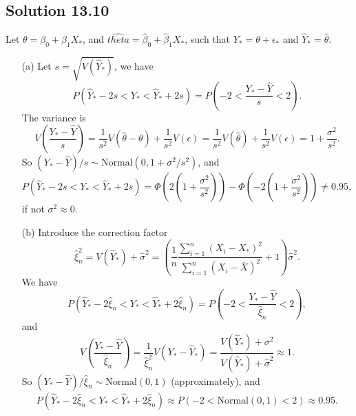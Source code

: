 \subsection*{Solution 13.10}

Let $\theta = \beta_0 + \beta_1 X_*$, and $\hat{theta} = \hat{\beta}_0 + \hat{\beta}_1 X_*$, such that $Y_* = \theta + \epsilon_*$ and $\hat{Y}_* = \hat{\theta}$.

\begin{itemize}
    \item[(a)] Let $s = \sqrt{V(\hat{Y}_*)}$, we have
        \begin{equation*}
            P\left(\hat{Y}_* - 2s < Y_* < \hat{Y}_* + 2s\right)
                = P\left(-2 < \frac{Y_* - \hat{Y}}{s} < 2\right).
        \end{equation*}
        The variance is
        \begin{equation*}
            V\left(\frac{Y_* - \hat{Y}}{s}\right)
                = \frac{1}{s^2}V\left(\hat{\theta} - \theta\right) + \frac{1}{s^2}V(\epsilon)
                = \frac{1}{s^2}V(\hat{\theta}) + \frac{1}{s^2}V(\epsilon)
                = 1 + \frac{\sigma^2}{s^2}.
        \end{equation*}
        So $(Y_* - \hat{Y})/s \sim \mathrm{Normal}(0, 1 + \sigma^2/s^2)$, and
        \begin{equation*}
            P\left(\hat{Y}_* - 2s < Y_* < \hat{Y}_* + 2s\right)
                = \Phi\left(2\left(1 + \frac{\sigma^2}{s^2}\right)\right) - \Phi\left(-2\left(1 + \frac{\sigma^2}{s^2}\right)\right)
                \neq 0.95,
        \end{equation*}
        if not $\sigma^2 \approx 0$.
    \item[(b)] Introduce the correction factor
        \begin{equation*}
            \hat{\xi}_n^2 = V(\hat{Y}_*) + \hat{\sigma}^2
                = \left(\frac{1}{n} \frac{\sum_{i = 1}^n (X_i - X_*)^2}{\sum_{i = 1}^n (X_i - \overline{X})^2} + 1\right) \hat{\sigma}^2.
        \end{equation*}
        We have
        \begin{equation*}
            P\left(\hat{Y}_* - 2\hat{\xi}_n < Y_* < \hat{Y}_* + 2\hat{\xi}_n\right)
                = P\left(-2 < \frac{Y_* - \hat{Y}}{\hat{\xi}_n} < 2\right),
        \end{equation*}
        and
        \begin{equation*}
            V\left(\frac{Y_* - \hat{Y}}{\hat{\xi}_n}\right)
                = \frac{1}{\hat{\xi}_n^2} V(Y_* - \hat{Y}_*)
                = \frac{V(\hat{Y}_*) + \sigma^2}{V(\hat{Y}_*) + \hat{\sigma}^2}
                \approx 1.
        \end{equation*}
        So $(Y_* - \hat{Y})/\hat{\xi}_n \sim \mathrm{Normal}(0, 1)$ (approximately), and
        \begin{equation*}
            P\left(\hat{Y}_* - 2\hat{\xi}_n < Y_* < \hat{Y}_* + 2\hat{\xi}_n\right)
                \approx P(-2 < \mathrm{Normal}(0, 1) < 2)
                \approx 0.95.
        \end{equation*}
\end{itemize}


